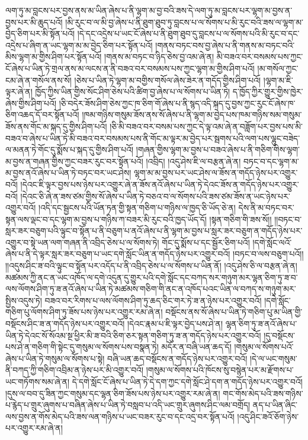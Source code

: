 ལག་ཏུ་མ་བླངས་པར་བྱས་ནས་མ་ཡིན་ཞེས་པ་ནི་ལྷག་མ་བྱ་བའི་ཟས་དེ་ལག་ཏུ་མ་བླངས་པར་ལྷག་མ་བྱས་ན་བྱས་པར་མི་ཆུད་པའོ། །མི་རུང་བ་ལ་མི་བྱ་ཞེས་པ་ནི་ཐུག་ཐུབ་ཏུ་བླངས་པ་ལ་སོགས་པ་མི་རུང་བའི་ཟས་ལ་ལྷག་མ་བྱེད་ཅིག་པར་མི་སྟོན་པའོ། །དེ་དང་འདྲེས་པ་ཡང་ངོ་ཞེས་པ་ནི་ཐུག་ཐུབ་དུ་བླངས་པ་ལ་སོགས་པའི་མི་རུང་བ་དང་འདྲེས་པ་ཞིག་ན་ཡང་ལྷག་མ་མ་བྱེད་ཅིག་པར་སྟོན་པའོ། །གནས་བཏང་བས་བྱ་ཞེས་པ་ནི་གནས་མ་བཏང་བའི་མིས་ལྷག་མ་གྱིས་ཤིག་པར་སྟོན་པའོ། །གནས་མ་བཏང་བ་ཉིད་ཅེས་བྱ་འམ་ཞེ་ན། མི་བཟའ་བར་བསམས་པས་ཀྱང་ངོ་ཞེས་པ་ཡིན་ཏེ་གྲལ་ནས་མ་ལངས་ན་ནི་བཟའ་བར་བསམས་པས་ཀྱང་ལྷག་མ་གྱིས་ཤིག་པའོ། །མ་གསོལ་ཀྱང་ངམ་ཞེ་ན་གསོལ་ནས་སོ། །ཅེས་པ་ཡིན་ཏེ་ལྷག་མ་བགྱིས་གསོལ་ཞེས་ཟེར་ན་གདོད་གྱིས་ཤིག་པའོ། །ལྷག་མ་ཇི་ལྟར་ཞེ་ན། ཁྱོད་ཀྱིས་ཡིན་གྱིས་སོང་ཤིག་ཅེས་པའི་ཚིག་བྱ་ཞེས་པ་ལ་སོགས་པ་ཡིན་ཏེ། ད་ཁྱོད་ཀྱིར་གྱུར་གྱིས་ཁྱེར་ཞེས་གྱིས་ཤིག་པའོ། །ཅི་བདེར་ཟོས་ཤིག་ཅེས་ཀྱང་ཁ་ཅིག་གོ་ཞེས་པ་ནི་སྙད་འདི་སྐད་དུ་བྱས་ཀྱང་རུང་ངོ་ཞེས་ཁ་ཅིག་འཆད་དོ་བར་སྟོན་པའོ། །ཁམ་གཉིས་གསུམ་ཟོས་ནས་སོ་ཞེས་པ་ནི་ལྷག་མ་བྱེད་པས་ཁམ་གཉིས་སམ་གསུམ་ཟོས་ནས་གོང་མ་སྐད་དུ་གྱིས་ཤིག་པའོ། །ཅི་མི་བཟའ་བར་བསམ་པས་ཀྱང་དེ་ལྟ་འམ་ཞེ་ན་བཟློག་པར་བྱས་པས་མི་བཟའ་བ་ཞེས་པ་ཡིན་ཏེ་མི་བཟའ་བར་བསམས་པས་ནི་གོང་མ་ལྟར་མ་བྱེད་པར་སྦགས་པའི་ལག་པས་ལྷུང་བཟེད་ལ་མནན་ཏེ་གོང་དུ་སྨོས་པ་སྐད་དུ་གྱིས་ཤིག་པའོ། །གཞན་གྱིས་ལྷག་མ་བྱས་པ་བཟའ་ཞེས་པ་ནི་གཅིག་གིས་ལྷག་མ་བྱས་ན་གཞན་གྱིས་ཀྱང་བཟར་རུང་བར་སྟོན་པའོ། །འབྲིད། །འདུ་ཤེས་ཇི་ལ་བརྩན་ཞེ་ན། བཏང་བ་དང་ལྷག་མ་མ་བྱས་ནའོ་ཞེས་པ་ཡིན་ཏེ་བཏང་བར་ཡང་ཤེས། ལྷག་མ་མ་བྱས་པར་ཡང་ཤེས་ལ་ཟོས་ན་གདོད་ཉེས་པར་འགྱུར་བའོ། །དེའང་ཇི་ལྟར་བྱས་པས་ཉེས་པར་འགྱུར་ཞེ་ན་ཟོས་ནའོ་ཞེས་པ་ཡིན་ཏེ་དེའང་ཟོས་ན་གདོད་ཉེས་པར་འགྱུར་བའོ། །དེའང་ཅི་ཞེ་ན་ཟས་ཙམ་གྱིས་སོ་ཞེས་པ་ཡིན་ཏེ་བཅའ་བ་ལ་སོགས་པའི་ཟས་ཙམ་ཟོས་ན་ཡང་ཉེས་པར་འགྱུར་བའོ། །འདི་དང་སྦྱངས་པའི་ཡོན་ཏན་གྱི་སྟན་གཅིག་པ་གཉིས་ལ་ཁྱད་ཅི་ཡོད་ཅེ་ན། དེས་ནི་མ་བཏང་བར་སྟན་ལས་ལྡང་བ་དང་ལྷག་མ་བྱས་པ་གཉིས་ཀ་བཟར་མི་རུང་བའི་ཁྱད་ཡོད་དོ། །སྟན་གཅིག་གི་ཟས་སོ།། །།བཏང་བ་སླར་ཟར་བཅུག་པའི་ལྟུང་བ་སྟོན་པ་ནི་བཅུག་པ་ནའོ་ཞེས་པ་ནི་ལྷག་མ་བྱས་པ་སླར་ཟར་བཅུག་ན་གདོད་ཉེས་པར་འགྱུར་བ་སྟེ་ཡན་ལག་གཞན་ནི་འབྲིད་ཅེས་པ་ལ་སོགས་ཏེ། གོང་དུ་སྨོས་པ་དང་སྦྱོར་ཅིག་པའོ། །དགེ་སློང་ལའོ་ཞེས་པ་ནི་དེ་ལྟར་སླར་ཟར་བཅུག་པ་ཡང་དགེ་སློང་ཡིན་ན་གདོད་ཉེས་པར་འགྱུར་བའོ། །བཏང་བ་ལས་བཅུག་པའོ།། །།འདུས་ཤིང་ཟ་བའི་ལྟུང་བ་སྟོན་པར་འདོད་པ་ནི་འབྲིད་ཅེས་པ་ལ་སོགས་པ་ཡིན་ནོ། །འདུ་ཤེས་ཅི་ལ་བརྩན་ཞེ་ན། མཚམས་ཀྱི་ནང་ན་ཡང་འཁོད་ལ་དགེ་འདུན་དུ་གྱུར་པའི་དགེ་སློང་དང་བཀད་སར་གཉུག་མར་ལྷན་ཅིག་ཏུ་ཟ་བ་ལས་ལོགས་ཤིག་ཏུ་ཟ་ནའོ་ཞེས་པ་ཡིན་ཏེ་མཚམས་གཅིག་གི་ནང་ན་འཁོད་པའང་ཡིན་ལ་བཀད་ས་གཉུག་མར་སྤྱིས་འདུས་ཏེ། བཟའ་བར་རིགས་པ་ལས་ལོགས་ཤིག་ཏུ་ཆད་ཅིང་གར་ཏེ་ཟ་ན་ཉེས་པར་འགྱུར་བའོ། །དགེ་སློང་གཅིག་པུ་ལོགས་ཤིག་ཏུ་ཟོས་པས་ཉེས་པར་འགྱུར་རམ་ཞེ་ན། བསྡོངས་ནས་སོ་ཞེས་པ་ཡིན་ཏེ་གཅིག་པུ་མ་ཡིན་གྱི་བསྡོངས་ཤིང་ཟ་ན་གདོད་ཉེས་པར་འགྱུར་བའོ། །དེའང་རྣམ་པ་ཇི་ལྟར་བྱེད་པས་ཤེ་ན། ལྷན་ཅིག་ཏུ་ཟ་ནའོ་ཞེས་པ་ཡིན་ཏེ་དེའང་སོ་སོའམ་སྔ་ཕྱིར་མི་ཟ་བའི་ཅིག་ཅར་སྟན་གཅིག་ཏུ་ཟ་ན་གདོད་ཉེས་པར་འགྱུར་བའོ། །དུ་བསྡོངས་པས་ཤེ་ན་གཅིག་གི་སྟེང་དུ་གསུམ་ལ་སོགས་པས་བསྣན་ཏེ། མདོར་ན་བཞི་ཡན་ཆད་དོ། །གསུམ་ལ་སོགས་པའོ་ཞེས་པ་ཡིན་ཏེ་གསུམ་ལ་སོགས་པ་སྟེ། བཞི་ཡན་ཆད་བསྡོངས་ན་གདོད་ཉེས་པར་འགྱུར་བའོ། །དེ་ལ་ཡང་གསུམ་ནི་བཀད་ཀྱི་གཅིག་འབྲིམ་ན་ཉེས་པར་མི་འགྱུར་བའོ། །གསུམ་ལ་སོགས་པའི་ཁོངས་སུ་བསྙེན་པར་མ་རྫོགས་པ་ཡང་གཏོགས་སམ་ཞེ་ན། དེ་དགེ་སློང་ངོ་ཞེས་པ་ཡིན་ཏེ་དེ་དག་ཀྱང་དགེ་སློང་ཤེ་དག་ན་གདོད་ཉེས་པར་འགྱུར་བའོ། །དུས་ལ་བབ་དུ་ཟིན་ཀྱང་གསུམ་དང་ལྷན་ཅིག་ཟོས་པས་ཉེས་པར་འགྱུར་རམ་ཞེ་ན། གང་གོས་མེད་པའི་ཟས་གཉིས་པ་རྙེད་པ་གྲུར་ཞུགས་པ་བཞིན་ཞེས་པ་ཡིན་ཏེ་བསླབ་པ་འདི་ཡང་གྲུར་ཞུགས་ཤིང་ལམ་བགྲོད། ནད་པ་ཡིན་ཞིང་ལས་བྱས་ན་གོས་མེད་པའི་ཟས་ལན་གཉིས་པ་ཡང་བཟར་རུང་བ་དང་འདྲ་བར་སྟོན་པའོ། །འདུ་ཤིང་ཟའོ་ཅོག་ཉེས་པར་འགྱུར་རམ་ཞེ་ན། 